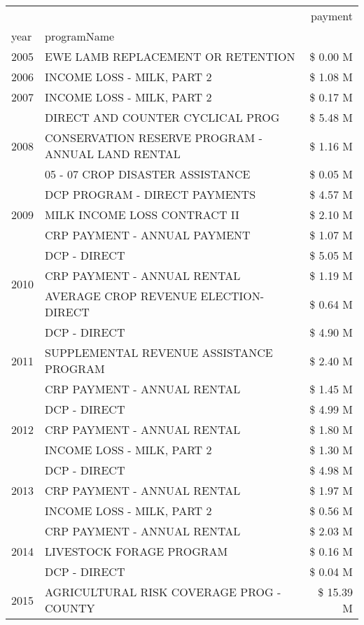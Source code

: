 \begin{tabular}{llr}
\toprule
 &  & payment \\
year & programName &  \\
\midrule
2005 & EWE LAMB REPLACEMENT OR RETENTION & \$ 0.00 M \\
\cline{1-3}
2006 & INCOME LOSS - MILK, PART 2 & \$ 1.08 M \\
\cline{1-3}
2007 & INCOME LOSS - MILK, PART 2 & \$ 0.17 M \\
\cline{1-3}
\multirow[t]{3}{*}{2008} & DIRECT AND COUNTER CYCLICAL PROG & \$ 5.48 M \\
 & CONSERVATION RESERVE PROGRAM - ANNUAL LAND RENTAL & \$ 1.16 M \\
 & 05 - 07 CROP DISASTER ASSISTANCE & \$ 0.05 M \\
\cline{1-3}
\multirow[t]{3}{*}{2009} & DCP PROGRAM - DIRECT PAYMENTS & \$ 4.57 M \\
 & MILK INCOME LOSS CONTRACT II & \$ 2.10 M \\
 & CRP PAYMENT - ANNUAL PAYMENT & \$ 1.07 M \\
\cline{1-3}
\multirow[t]{3}{*}{2010} & DCP - DIRECT & \$ 5.05 M \\
 & CRP PAYMENT - ANNUAL RENTAL & \$ 1.19 M \\
 & AVERAGE CROP REVENUE ELECTION-DIRECT & \$ 0.64 M \\
\cline{1-3}
\multirow[t]{3}{*}{2011} & DCP - DIRECT & \$ 4.90 M \\
 & SUPPLEMENTAL REVENUE ASSISTANCE PROGRAM & \$ 2.40 M \\
 & CRP PAYMENT - ANNUAL RENTAL & \$ 1.45 M \\
\cline{1-3}
\multirow[t]{3}{*}{2012} & DCP - DIRECT & \$ 4.99 M \\
 & CRP PAYMENT - ANNUAL RENTAL & \$ 1.80 M \\
 & INCOME LOSS - MILK, PART 2 & \$ 1.30 M \\
\cline{1-3}
\multirow[t]{3}{*}{2013} & DCP - DIRECT & \$ 4.98 M \\
 & CRP PAYMENT - ANNUAL RENTAL & \$ 1.97 M \\
 & INCOME LOSS - MILK, PART 2 & \$ 0.56 M \\
\cline{1-3}
\multirow[t]{3}{*}{2014} & CRP PAYMENT - ANNUAL RENTAL & \$ 2.03 M \\
 & LIVESTOCK FORAGE PROGRAM & \$ 0.16 M \\
 & DCP - DIRECT & \$ 0.04 M \\
\cline{1-3}
\multirow[t]{3}{*}{2015} & AGRICULTURAL RISK COVERAGE PROG - COUNTY & \$ 15.39 M \\

\end{tabular}

